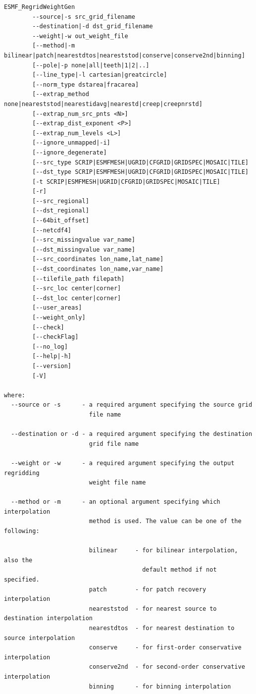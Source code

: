 \begin{verbatim}
ESMF_RegridWeightGen  
        --source|-s src_grid_filename
        --destination|-d dst_grid_filename
        --weight|-w out_weight_file
        [--method|-m bilinear|patch|nearestdtos|neareststod|conserve|conserve2nd|binning]
        [--pole|-p none|all|teeth|1|2|..]
        [--line_type|-l cartesian|greatcircle]
        [--norm_type dstarea|fracarea]
        [--extrap_method none|neareststod|nearestidavg|nearestd|creep|creepnrstd]
        [--extrap_num_src_pnts <N>]
        [--extrap_dist_exponent <P>]
        [--extrap_num_levels <L>]
        [--ignore_unmapped|-i]
        [--ignore_degenerate]
        [--src_type SCRIP|ESMFMESH|UGRID|CFGRID|GRIDSPEC|MOSAIC|TILE]
        [--dst_type SCRIP|ESMFMESH|UGRID|CFGRID|GRIDSPEC|MOSAIC|TILE]
        [-t SCRIP|ESMFMESH|UGRID|CFGRID|GRIDSPEC|MOSAIC|TILE]
        [-r]
        [--src_regional]
        [--dst_regional]
        [--64bit_offset]
        [--netcdf4]
        [--src_missingvalue var_name]
        [--dst_missingvalue var_name]
        [--src_coordinates lon_name,lat_name]
        [--dst_coordinates lon_name,var_name]
        [--tilefile_path filepath]
        [--src_loc center|corner]
        [--dst_loc center|corner]
        [--user_areas]
        [--weight_only]
        [--check]
        [--checkFlag]
        [--no_log]
        [--help|-h]
        [--version]
        [-V]

where:
  --source or -s      - a required argument specifying the source grid
                        file name

  --destination or -d - a required argument specifying the destination
                        grid file name

  --weight or -w      - a required argument specifying the output regridding
                        weight file name

  --method or -m      - an optional argument specifying which interpolation
                        method is used. The value can be one of the following:

                        bilinear     - for bilinear interpolation, also the
                                       default method if not specified.
                        patch        - for patch recovery interpolation
                        neareststod  - for nearest source to destination interpolation
                        nearestdtos  - for nearest destination to source interpolation
                        conserve     - for first-order conservative interpolation
                        conserve2nd  - for second-order conservative interpolation
                        binning      - for binning interpolation


\end{verbatim}
